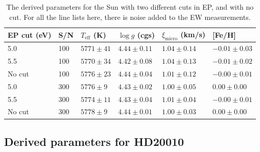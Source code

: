\documentclass{aa}
\begin{document}
\begin{table}[tb!]
    \caption{The derived parameters for the Sun with two different cuts
    in EP, and with no cut. For all the line lists here, there is noise
    added to the EW measurements.}
    \label{tab:sun}
    \centering
    \begin{tabular}{llllll}
      \hline\hline
        EP cut (eV) &  S/N &  $T_\mathrm{eff}$ (K) &  $\log g$ (cgs)     &  $\xi_\mathrm{micro}$ (km/s) &  [Fe/H]           \\
      \hline
        5.0         &  100 &  $5771 \pm  41$       & $4.44   \pm  0.11$  & $1.04  \pm  0.14$            & $-0.01    \pm 0.03$\\
        5.5         &  100 &  $5770 \pm  34$       & $4.42   \pm  0.08$  & $1.04  \pm  0.13$            & $-0.01    \pm 0.02$\\
        No cut      &  100 &  $5776 \pm  23$       & $4.44   \pm  0.04$  & $1.01  \pm  0.12$            & $-0.00    \pm 0.01$\\
      \hline
        5.0         &  300 &  $5776 \pm  9 $       & $4.43   \pm  0.02$  & $1.00  \pm  0.05$            &  $0.00    \pm 0.00$\\
        5.5         &  300 &  $5774 \pm  11$       & $4.43   \pm  0.04$  & $1.01  \pm  0.04$            & $-0.00    \pm 0.01$\\
        No cut      &  300 &  $5778 \pm  9 $       & $4.44   \pm  0.01$  & $1.00  \pm  0.03$            &  $0.00    \pm 0.00$\\
      \hline
    \end{tabular}
\end{table}




\subsection{Derived parameters for HD20010}
\label{sec:derived_parameters_of_hd20010}
\end{document}
